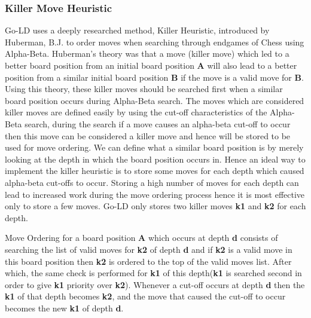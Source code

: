 \documentclass{l4proj}
\newcommand{\bo}[1]{\textbf{#1}}
\begin{document}
\subsubsection{Killer Move Heuristic}
Go-LD uses a deeply researched \citep{Akl1977} method, Killer Heuristic, introduced by Huberman, B.J. to order moves when searching through endgames of Chess using Alpha-Beta. Huberman’s theory \citep{Huberman1968} was that a move (killer move) which led to a better board position from an initial board position \bo{A} will also lead to a better position from a similar initial board position \bo{B} if the move is a valid move for \bo{B}. Using this theory, these killer moves should be searched first when a similar board position occurs during Alpha-Beta search. The moves which are considered killer moves are defined easily by using the cut-off characteristics of the Alpha-Beta search, during the search if a move causes an alpha-beta cut-off to occur then this move can be considered a killer move and hence will be stored to be used for move ordering.  We can define what a similar board position is by merely looking at the depth in which the board position occurs in. Hence an ideal way to implement the killer heuristic is to store some moves for each depth which caused alpha-beta cut-offs to occur. Storing a high number of moves for each depth can lead to increased work during the move ordering process hence it is most effective only to store a few moves. Go-LD only stores two killer moves \bo{k1} and \bo{k2}  for each depth.

Move Ordering for a board position \bo{A} which occurs at depth \bo{d} consists of searching the list of valid moves for \bo{k2} of depth \bo{d} and if \bo{k2} is a valid move in this board position then \bo{k2} is ordered to the top of the valid moves list. After which, the same check is performed for \bo{k1} of this depth(\bo{k1} is searched second in order to give \bo{k1} priority over \bo{k2}). Whenever a cut-off occurs at depth \bo{d} then the \bo{k1} of that depth becomes \bo{k2}, and the move that caused the cut-off to occur becomes the new \bo{k1} of depth \bo{d}.
\end{document}
